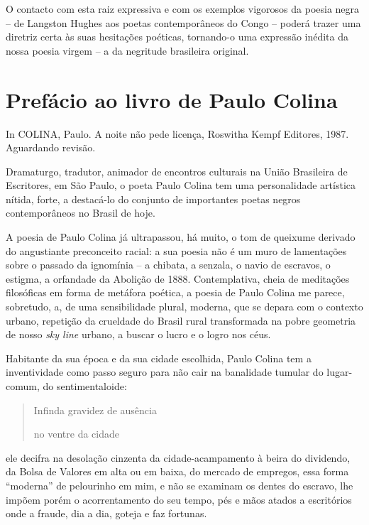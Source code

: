 \documentclass[
  letterpaper,
  DIV=11,
  numbers=noendperiod]{scrreprt}
\begin{document}
O contacto com esta raiz expressiva e com os exemplos vigorosos da
poesia negra -- de Langston Hughes aos poetas contemporâneos do Congo --
poderá trazer uma diretriz certa às suas hesitações poéticas, tornando-o
uma expressão inédita da nossa poesia virgem -- a da negritude
brasileira original.

\chapter{Prefácio ao livro de Paulo
Colina}\label{prefuxe1cio-ao-livro-de-paulo-colina}

In COLINA, Paulo. A noite não pede licença, Roswitha Kempf Editores,
1987. Aguardando revisão.

\hfill\break

Dramaturgo, tradutor, animador de encontros culturais na União
Brasileira de Escritores, em São Paulo, o poeta Paulo Colina tem uma
personalidade artística nítida, forte, a destacá-lo do conjunto de
importantes poetas negros contemporâneos no Brasil de hoje.

A poesia de Paulo Colina já ultrapassou, há muito, o tom de queixume
derivado do angustiante preconceito racial: a sua poesia não é um muro
de lamentações sobre o passado da ignomínia -- a chibata, a senzala, o
navio de escravos, o estigma, a orfandade da Abolição de 1888.
Contemplativa, cheia de meditações filosóficas em forma de metáfora
poética, a poesia de Paulo Colina me parece, sobretudo, a, de uma
sensibilidade plural, moderna, que se depara com o contexto urbano,
repetição da crueldade do Brasil rural transformada na pobre geometria
de nosso \emph{sky line} urbano, a buscar o lucro e o logro nos céus.

Habitante da sua época e da sua cidade escolhida, Paulo Colina tem a
inventividade como passo seguro para não cair na banalidade tumular do
lugar-comum, do sentimentaloide:

\begin{quote}
Infinda gravidez de ausência~

no ventre da cidade
\end{quote}

ele decifra na desolação cinzenta da cidade-acampamento à beira do
dividendo, da Bolsa de Valores em alta ou em baixa, do mercado de
empregos, essa forma ``moderna'' de pelourinho em mim, e não se examinam
os dentes do escravo, lhe impõem porém o acorrentamento do seu tempo,
pés e mãos atados a escritórios onde a fraude, dia a dia, goteja e faz
fortunas.
\end{document}
